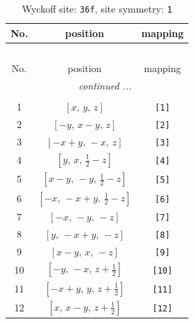\documentclass[fleqn,8pt]{jsarticle}
\begin{document}
\begin{longtable}{ccc}
\caption{Wyckoff site: {\tt 36f}, site symmetry: {\tt 1}}
 \\
 \hline \hline
No. & position & mapping \\ \hline \endfirsthead

\multicolumn{2}{l}{\tablename\ \thetable{}} \\
 \hline \hline
No. & position & mapping \\ \hline \endhead

 \hline \hline
\multicolumn{2}{r}{\footnotesize\it continued ...} \\ \endfoot

 \hline \hline
\multicolumn{2}{r}{} \\ \endlastfoot

1 & $\left[ x,\, y,\, z \right]$ & {\tt [1]} \\ \hline
2 & $\left[ - y,\, x - y,\, z \right]$ & {\tt [2]} \\ \hline
3 & $\left[ - x + y,\, - x,\, z \right]$ & {\tt [3]} \\ \hline
4 & $\left[ y,\, x,\, \frac{1}{2} - z \right]$ & {\tt [4]} \\ \hline
5 & $\left[ x - y,\, - y,\, \frac{1}{2} - z \right]$ & {\tt [5]} \\ \hline
6 & $\left[ - x,\, - x + y,\, \frac{1}{2} - z \right]$ & {\tt [6]} \\ \hline
7 & $\left[ - x,\, - y,\, - z \right]$ & {\tt [7]} \\ \hline
8 & $\left[ y,\, - x + y,\, - z \right]$ & {\tt [8]} \\ \hline
9 & $\left[ x - y,\, x,\, - z \right]$ & {\tt [9]} \\ \hline
10 & $\left[ - y,\, - x,\, z + \frac{1}{2} \right]$ & {\tt [10]} \\ \hline
11 & $\left[ - x + y,\, y,\, z + \frac{1}{2} \right]$ & {\tt [11]} \\ \hline
12 & $\left[ x,\, x - y,\, z + \frac{1}{2} \right]$ & {\tt [12]} \\
\end{longtable}
\end{document}

